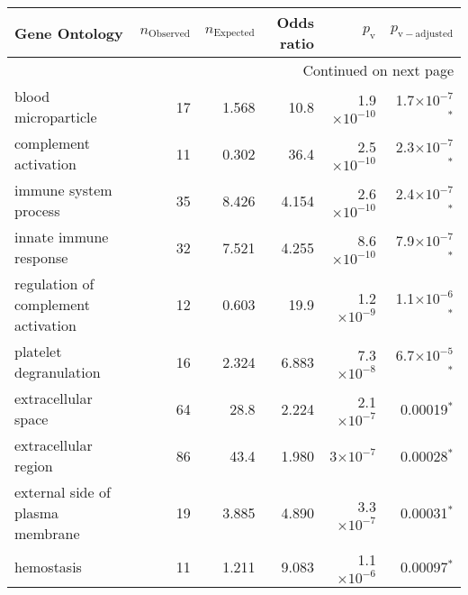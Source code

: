 \begin{longtable}{|l|r|r|r|r|r|}
\toprule
                                     Gene Ontology & $n_{\mathrm{Observed}}$ & $n_{\mathrm{Expected}}$ & Odds ratio &     $p_{\mathrm{v}}$ &     $p_{\mathrm{v-adjusted}}$ \\
\midrule
\endhead
\midrule
\multicolumn{6}{r}{{Continued on next page}} \\
\midrule
\endfoot

\bottomrule
\endlastfoot
                               blood microparticle &                      17 &                   1.568 &       10.8 & 1.9$\times 10^{-10}$ &  1.7$\times 10^{-7}$$\bm{^*}$ \\
                             complement activation &                      11 &                   0.302 &       36.4 & 2.5$\times 10^{-10}$ &  2.3$\times 10^{-7}$$\bm{^*}$ \\
                             immune system process &                      35 &                   8.426 &      4.154 & 2.6$\times 10^{-10}$ &  2.4$\times 10^{-7}$$\bm{^*}$ \\
                            innate immune response &                      32 &                   7.521 &      4.255 & 8.6$\times 10^{-10}$ &  7.9$\times 10^{-7}$$\bm{^*}$ \\
               regulation of complement activation &                      12 &                   0.603 &       19.9 &  1.2$\times 10^{-9}$ &  1.1$\times 10^{-6}$$\bm{^*}$ \\
                            platelet degranulation &                      16 &                   2.324 &      6.883 &  7.3$\times 10^{-8}$ &  6.7$\times 10^{-5}$$\bm{^*}$ \\
                               extracellular space &                      64 &                    28.8 &      2.224 &  2.1$\times 10^{-7}$ &              0.00019$\bm{^*}$ \\
                              extracellular region &                      86 &                    43.4 &      1.980 &    3$\times 10^{-7}$ &              0.00028$\bm{^*}$ \\
                  external side of plasma membrane &                      19 &                   3.885 &      4.890 &  3.3$\times 10^{-7}$ &              0.00031$\bm{^*}$ \\
                                        hemostasis &                      11 &                   1.211 &      9.083 &  1.1$\times 10^{-6}$ &              0.00097$\bm{^*}$ \\

\end{longtable}
